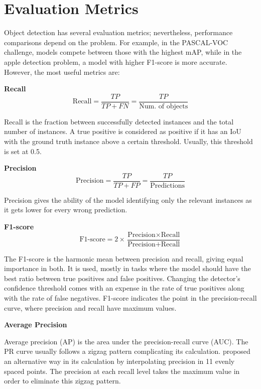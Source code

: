 \section{Evaluation Metrics}
Object detection has several evaluation metrics; nevertheless, performance comparisons depend on the problem. For example, in the PASCAL-VOC challenge, models compete between those with the highest mAP, while in the apple detection problem, a model with higher F1-score is more accurate. However, the most useful metrics are:

\bigskip
\textbf{Recall}
\bigskip\noindent
\begin{equation}
  \text{Recall} = \frac{TP}{TP+FN}=\frac{TP}{\text{Num. of objects}}
\end{equation} 

Recall is the fraction between successfully detected instances and the total number of instances. A true positive is considered as positive if it has an IoU with the ground truth instance above a certain threshold. Usually, this threshold is set at 0.5.

\bigskip
\textbf{Precision}
\bigskip\noindent
\begin{equation}
  \text{Precision} = \frac{TP}{TP+FP}=\frac{TP}{\text{Predictions}}
\end{equation} 

Precision gives the ability of the model identifying only the relevant instances as it gets lower for every wrong prediction.

\bigskip
\textbf{F1-score}
\bigskip\noindent
\begin{equation}
  \text{F1-score} = 2\times\frac{\text{Precision}\times \text{Recall}}{\text{Precision}+\text{Recall}}\end{equation} 
  
The F1-score is the harmonic mean between precision and recall, giving equal importance in both. It is used, mostly in tasks where the model should have the best ratio between true positives and false positives. Changing the detector's confidence threshold comes with an expense in the rate of true positives along with the rate of false negatives. F1-score indicates the point in the precision-recall curve, where precision and recall have maximum values.

\bigskip
\textbf{Average Precision}
\bigskip\noindent

Average precision (AP) is the area under the precision-recall curve (AUC). The PR curve usually follows a zigzag pattern complicating its calculation. \cite{everingham2010pascal} proposed an alternative way in its calculation by interpolating precision in 11 evenly spaced points. The precision at each recall level takes the maximum value in order to eliminate this zigzag pattern.

